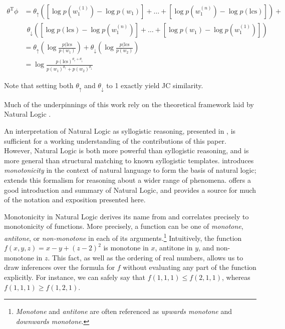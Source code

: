 \documentclass[11pt,a4paper]{article}
\begin{document}
\begin{align*}
\theta^{\textrm{T}}\phi
  &= \theta_\uparrow \left( 
    \left[\log p(w_1^{(1)}) - \log p(w_1)\right] +
    \dots +
    \left[\log p(w_1^{(n)}) - \log p(\textrm{lcs})\right]
    \right) + \\
  &~~ \theta_\downarrow \left( 
    \left[\log p(\textrm{lcs}) - \log p(w_1^{(n)}) \right] +
    \dots +
    \left[\log p(w_1) - \log p(w_1^{(1)})\right]
    \right) \\
  &= \theta_\uparrow \left( \log \frac{p(\textrm{lcs}}{p(w_1)} \right) +
     \theta_\downarrow \left( \log \frac{p(\textrm{lcs}}{p(w_2)} \right) \\
  &= \log \frac{ p(\textrm{lcs})^{\theta_\uparrow + \theta_\downarrow} }
               { p(w_1)^{\theta_\uparrow} + p(w_2)^{\theta_\downarrow} }
\end{align*}

Note that setting both $\theta_\uparrow$ and $\theta_\downarrow$ to 1 exactly
  yield JC similarity.



Much of the underpinnings of this work rely on the theoretical framework
  laid by Natural Logic
  \cite{key:1986benthem-natlog,key:1991valencia-natlog}.

An interpretation of Natural Logic as syllogistic reasoning,
  presented in , is sufficient
  for a working understanding of the contributions of this paper.
However, Natural Logic is both more powerful than syllogistic reasoning,
  and is more general than structural matching to known
  syllogistic templates.
 introduces \textit{monotonicity} in the context
  of natural language to form the basis of natural logic;
   extends this formalism for reasoning about
  a wider range of phenomena.
\citet{key:2014icard-natlog} offers a good introduction and summary of
  Natural Logic, and provides a source for much of the notation and
  exposition presented here.


Monotonicity in Natural Logic derives its name from and correlates
  precisely to monotonicity of functions.
More precisely, a function can be one of \textit{monotone},
  \textit{antitone}, or \textit{non-monotone} in each of its
  arguments.\footnote{
    \textit{Monotone} and \textit{antitone} are often referenced
    as \textit{upwards monotone} and \textit{downwards monotone}.
  }
Intuitively, the function $f(x,y,z) = x - y + (z-2)^2$ is
  monotone in $x$, antitone in $y$, and non-monotone in $z$.
This fact, as well as the ordering of real numbers, allows us to
  draw inferences over the formula for $f$ without evaluating
  any part of the function explicitly.
For instance, we can safely say that $f(1,1,1) \leq f(2,1,1)$, whereas
  $f(1,1,1) \geq f(1,2,1)$.
\end{document}

